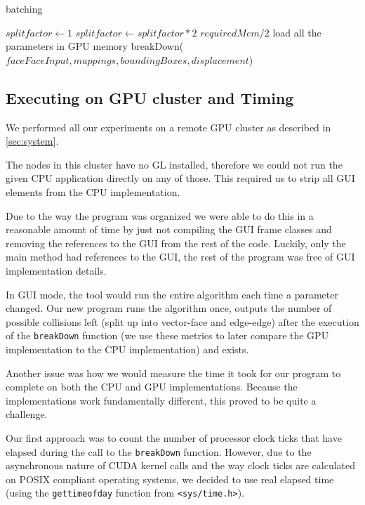 \begin{algorithm}
\caption{batching}\label{batch}
\begin{algorithmic}[1]
    \State $splitfactor \gets 1$
        \State $splitfactor \gets splitfactor * 2$
        \State $requiredMem / 2$
    \EndWhile
        \State load all the parameters in GPU memory
        \State breakDown($faceFaceInput, mappings, boundingBoxes, displacement $) 
    \EndFor
\EndProcedure
\end{algorithmic}
\end{algorithm}

\subsection{Executing on GPU cluster and Timing}
We performed all our experiments on a remote GPU cluster as described in \ref{sec:system}.

The nodes in this cluster have no GL installed, therefore we could not run the given CPU application directly on any of those.
This required us to strip all GUI elements from the CPU implementation.

Due to the way the program was organized we were able to do this in a reasonable amount of time by just not compiling the GUI frame classes and removing the references to the GUI from the rest of the code.
Luckily, only the main method had references to the GUI, the rest of the program was free of GUI implementation details.

In GUI mode, the tool would run the entire algorithm each time a parameter changed.
Our new program runs the algorithm once, outputs the number of possible collisions left (split up into vector-face and edge-edge) after the execution of the \texttt{breakDown} function (we use these metrics to later compare the GPU implementation to the CPU implementation) and exists.

Another issue was how we would measure the time it took for our program to complete on both the CPU and GPU implementations.
Because the implementations work fundamentally different, this proved to be quite a challenge.

Our first approach was to count the number of processor clock ticks that have elapsed during the call to the \texttt{breakDown} function.
However, due to the asynchronous nature of CUDA kernel calls and the way clock ticks are calculated on POSIX compliant operating systems, we decided to use real elapsed time (using the \texttt{gettimeofday} function from \texttt{<sys/time.h>}).

